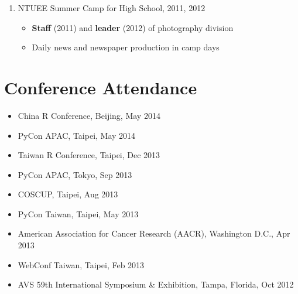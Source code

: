 \documentclass[11pt, a4paper]{scrartcl}
\begin{document}
\begin{enumerate}
    \item NTUEE Summer Camp for High School, 2011, 2012
    \begin{itemize}
        \item \textbf{Staff} (2011) and \textbf{leader} (2012) of photography division
        \item Daily news and newspaper production in camp days
    \end{itemize}

\end{enumerate}


\section*{Conference Attendance}
\begin{multicols}{2}
\begin{itemize}
    \item China R Conference, Beijing, May 2014
    \item PyCon APAC, Taipei, May 2014
    \item Taiwan R Conference, Taipei, Dec 2013
    \item PyCon APAC, Tokyo, Sep 2013
    \item COSCUP, Taipei, Aug 2013
    \item PyCon Taiwan, Taipei, May 2013
    \item American Association for Cancer Research (AACR), Washington D.C., Apr 2013
    \item WebConf Taiwan, Taipei, Feb 2013
    \item AVS 59th International Symposium \& Exhibition, Tampa, Florida, Oct 2012
\end{itemize}
\end{multicols}
%
\end{document}
